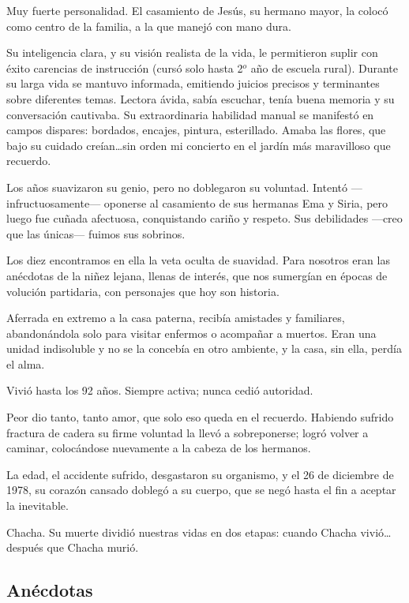 \documentclass{article}
\begin{document}
Muy fuerte personalidad. El casamiento de Jesús, su hermano mayor, la colocó como centro de la familia, a la que manejó con mano dura.

Su inteligencia clara, y su visión realista de la vida, le permitieron suplir con éxito carencias de instrucción (cursó solo hasta 2$^o$ año de escuela rural). Durante su larga vida se mantuvo informada, emitiendo juicios precisos y terminantes sobre diferentes temas. Lectora ávida, sabía escuchar, tenía buena memoria y su conversación cautivaba. Su extraordinaria habilidad manual se manifestó en campos dispares: bordados, encajes, pintura, esterillado. Amaba las flores, que bajo su cuidado creían\ldots sin orden mi concierto en el jardín más maravilloso que recuerdo.

Los años suavizaron su genio, pero no doblegaron su voluntad. Intentó ---infructuosamente--- oponerse al casamiento de sus hermanas Ema y Siria, pero luego fue cuñada afectuosa, conquistando cariño y respeto. Sus debilidades ---creo que las únicas--- fuimos sus sobrinos.

Los diez encontramos en ella la veta oculta de suavidad. Para nosotros eran las anécdotas de la niñez lejana, llenas de interés, que nos sumergían en épocas de volución partidaria, con personajes que hoy son historia.

Aferrada en extremo a la casa paterna, recibía amistades y familiares, abandonándola solo para visitar enfermos o acompañar a muertos. Eran una unidad indisoluble y no se la concebía en otro ambiente, y la casa, sin ella, perdía el alma.

Vivió hasta los 92 años. Siempre activa; nunca cedió autoridad.

Peor dio tanto, tanto amor, que solo eso queda en el recuerdo. Habiendo sufrido fractura de cadera su firme voluntad la llevó a sobreponerse; logró volver a caminar, colocándose nuevamente a la cabeza de los hermanos.

La edad, el accidente sufrido, desgastaron su organismo, y el 26 de diciembre de 1978, su corazón cansado doblegó a su cuerpo, que se negó hasta el fin a aceptar la inevitable.

Chacha. Su muerte dividió nuestras vidas en dos etapas: cuando Chacha vivió\ldots después que Chacha murió.

\subsection{Anécdotas}
\end{document}
